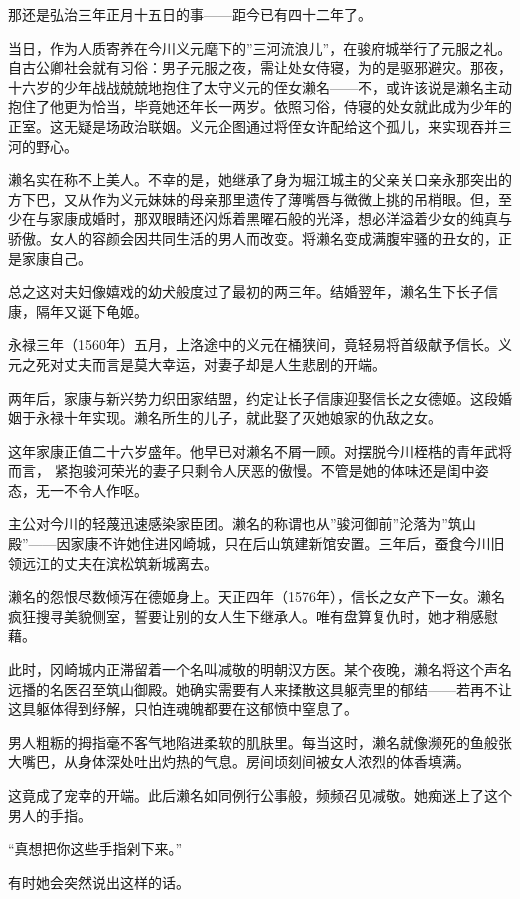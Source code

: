 \documentclass[
]{article}
\begin{document}
那还是弘治三年正月十五日的事------距今已有四十二年了。

当日，作为人质寄养在今川义元麾下的''三河流浪儿''，在骏府城举行了元服之礼。自古公卿社会就有习俗：男子元服之夜，需让处女侍寝，为的是驱邪避灾。那夜，十六岁的少年战战兢兢地抱住了太守义元的侄女濑名------不，或许该说是濑名主动抱住了他更为恰当，毕竟她还年长一两岁。依照习俗，侍寝的处女就此成为少年的正室。这无疑是场政治联姻。义元企图通过将侄女许配给这个孤儿，来实现吞并三河的野心。

濑名实在称不上美人。不幸的是，她继承了身为堀江城主的父亲关口亲永那突出的方下巴，又从作为义元妹妹的母亲那里遗传了薄嘴唇与微微上挑的吊梢眼。但，至少在与家康成婚时，那双眼睛还闪烁着黑曜石般的光泽，想必洋溢着少女的纯真与骄傲。女人的容颜会因共同生活的男人而改变。将濑名变成满腹牢骚的丑女的，正是家康自己。

总之这对夫妇像嬉戏的幼犬般度过了最初的两三年。结婚翌年，濑名生下长子信康，隔年又诞下龟姬。

永禄三年（1560年）五月，上洛途中的义元在桶狭间，竟轻易将首级献予信长。义元之死对丈夫而言是莫大幸运，对妻子却是人生悲剧的开端。

两年后，家康与新兴势力织田家结盟，约定让长子信康迎娶信长之女德姬。这段婚姻于永禄十年实现。濑名所生的儿子，就此娶了灭她娘家的仇敌之女。

这年家康正值二十六岁盛年。他早已对濑名不屑一顾。对摆脱今川桎梏的青年武将而言， 紧抱骏河荣光的妻子只剩令人厌恶的傲慢。不管是她的体味还是闺中姿态，无一不令人作呕。

主公对今川的轻蔑迅速感染家臣团。濑名的称谓也从''骏河御前''沦落为''筑山殿''------因家康不许她住进冈崎城，只在后山筑建新馆安置。三年后，蚕食今川旧领远江的丈夫在滨松筑新城离去。

濑名的怨恨尽数倾泻在德姬身上。天正四年（1576年），信长之女产下一女。濑名疯狂搜寻美貌侧室，誓要让别的女人生下继承人。唯有盘算复仇时，她才稍感慰藉。

此时，冈崎城内正滞留着一个名叫减敬的明朝汉方医。某个夜晚，濑名将这个声名远播的名医召至筑山御殿。她确实需要有人来揉散这具躯壳里的郁结------若再不让这具躯体得到纾解，只怕连魂魄都要在这郁愤中窒息了。

男人粗粝的拇指毫不客气地陷进柔软的肌肤里。每当这时，濑名就像濒死的鱼般张大嘴巴，从身体深处吐出灼热的气息。房间顷刻间被女人浓烈的体香填满。

这竟成了宠幸的开端。此后濑名如同例行公事般，频频召见减敬。她痴迷上了这个男人的手指。

``真想把你这些手指剁下来。''

有时她会突然说出这样的话。
\end{document}
